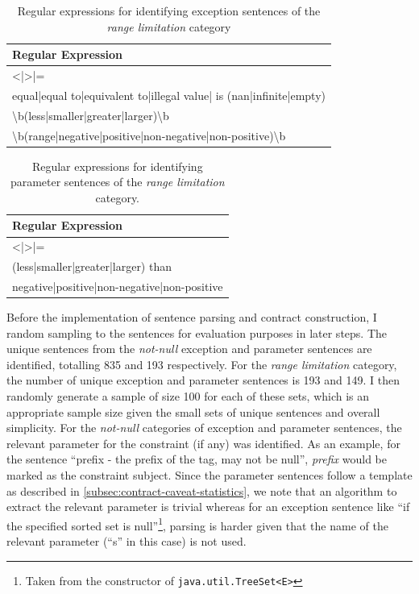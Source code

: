 \begin{table}[h]
	\centering
	\begin{tabular}{|l|}
		\hline
		\textbf{Regular Expression} \\ \hline
		\textless{}|\textgreater{}|= \\ \hline
		equal|equal to|equivalent to|illegal value| is (nan|infinite|empty) \\ \hline
		\textbackslash{}b(less|smaller|greater|larger)\textbackslash{}b \\ \hline
		\textbackslash{}b(range|negative|positive|non-negative|non-positive)\textbackslash{}b \\ \hline
	\end{tabular}
	\caption{Regular expressions for identifying exception sentences of the \textit{range limitation} category}
	\label{tab:except-range}
\end{table}

\begin{table}[h]
	\centering
	\begin{tabular}{|l|}
		\hline
		\textbf{Regular Expression} \\ \hline
		\textless{}|\textgreater{}|= \\ \hline
		(less|smaller|greater|larger) than \\ \hline
		negative|positive|non-negative|non-positive \\ \hline
	\end{tabular}
	\caption{Regular expressions for identifying parameter sentences of the \textit{range limitation} category.}
	\label{tab:param-range}
\end{table}

Before the implementation of sentence parsing and contract construction, I random sampling to the sentences for evaluation purposes in later steps. The unique sentences from the \textit{not-null} exception and parameter sentences are identified, totalling 835 and 193 respectively. For the \textit{range limitation} category, the number of unique exception and parameter sentences is 193 and 149. I then randomly generate a sample of size 100 for each of these sets, which is an appropriate sample size given the small sets of unique sentences and overall simplicity. For the \textit{not-null} categories of exception and parameter sentences, the relevant parameter for the constraint (if any) was identified. As an example, for the sentence ``prefix - the prefix of the tag, may not be null'', \textit{prefix} would be marked as the constraint subject. Since the parameter sentences follow a template as described in \ref{subsec:contract-caveat-statistics}, we note that an algorithm to extract the relevant parameter is trivial whereas for an exception sentence like ``if the specified sorted set is null''\footnote{Taken from the constructor of \lstinline{java.util.TreeSet<E>}}, parsing is harder given that the name of the relevant parameter (``s'' in this case) is not used. \bigbreak

